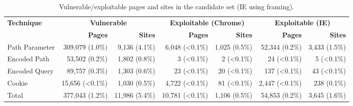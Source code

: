 \begin{table*}[t]
    \centering
    \caption{Vulnerable/exploitable pages and sites in the candidate set (IE using framing).}
    \label{rpo:tab:vulnerable_exploitable_result}
    \footnotesize
    \begin{tabular}{lrrrrrr}
    \toprule
    \multirow{2}{*}{\textbf{Technique}} &
    \multicolumn{2}{c}{\textbf{Vulnerable}} &
    \multicolumn{2}{c}{\textbf{Exploitable (Chrome)}} &
    \multicolumn{2}{c}{\textbf{Exploitable (IE)}} \\

    \cmidrule[0.5pt](lr){2-3}
    \cmidrule[0.5pt](lr){4-5}
    \cmidrule[0.5pt](lr){6-7}

    &
    \textbf{Pages} &
    \textbf{Sites} &
    \textbf{Pages} &
    \textbf{Sites} &
    \textbf{Pages} &
    \textbf{Sites}
    \\

    \midrule

    Path Parameter & 309,079 (1.0\%) & 9,136 (4.1\%) & 6,048 (\textless 0.1\%) & 1,025 (0.5\%) & 52,344 (0.2\%) & 3,433 (1.5\%) \\
    Encoded Path & 53,502 (0.2\%) & 1,802 (0.8\%) & 3 (\textless 0.1\%) & 2 (\textless 0.1\%) & 24 (\textless 0.1\%) & 5 (\textless 0.1\%) \\
    Encoded Query & 89,757 (0.3\%) & 1,303 (0.6\%) & 23 (\textless 0.1\%) & 20 (\textless 0.1\%) & 137 (\textless 0.1\%) & 43 (\textless 0.1\%) \\
    Cookie & 15,656 (\textless 0.1\%) & 1,030 (0.5\%) & 4,722 (\textless 0.1\%) & 81 (\textless 0.1\%) & 2,447 (\textless 0.1\%) & 238 (0.1\%) \\

    \midrule

    Total & 377,043 (1.2\%) & 11,986 (5.4\%) & 10,781 (<0.1\%) & 1,106 (0.5\%) & 54,853 (0.2\%) & 3,645 (1.6\%) \\

    \bottomrule
    \end{tabular}

\end{table*}
